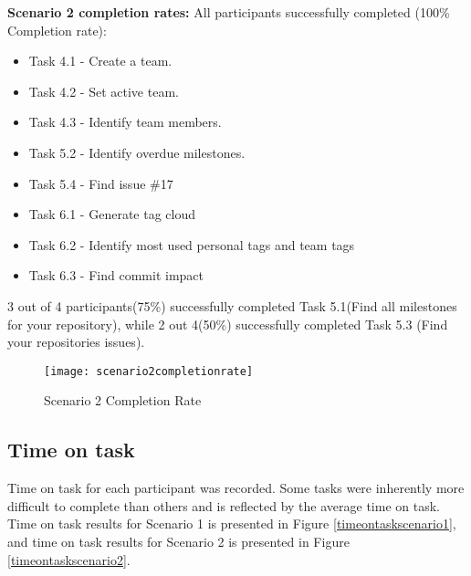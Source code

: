 \textbf{Scenario 2 completion rates:}
All participants successfully completed (100\% Completion rate):
\begin{itemize}
	\item Task 4.1 - Create a team. 
	\item Task 4.2 - Set active team. 
	\item Task 4.3 - Identify team members. 
	\item Task 5.2 - Identify overdue milestones. 
	\item Task 5.4 - Find issue \#17
	\item Task 6.1 - Generate tag cloud
	\item Task 6.2 - Identify most used personal tags and team tags
	\item Task 6.3 - Find commit impact
\end{itemize}
3 out of 4 participants(75\%) successfully completed Task 5.1(Find all milestones for your repository), while 2 out 4(50\%) successfully completed Task 5.3 (Find your repositories issues). 

\begin{figure}[h!]
    \centering
        \texttt{[image: scenario2completionrate]}
    \caption{Scenario 2 Completion Rate}
    \label{scenario2completionrate}
\end{figure}

\subsection*{Time on task}
Time on task for each participant was recorded. Some tasks were inherently more difficult to complete than others and is reflected by the average time on task. Time on task results for Scenario 1 is presented in Figure \ref{timeontaskscenario1}, and time on task results for Scenario 2 is presented in Figure \ref{timeontaskscenario2}.
